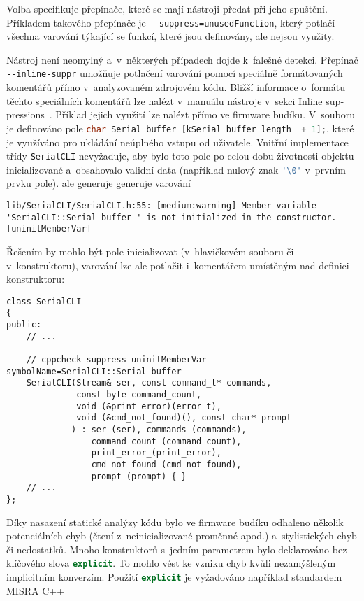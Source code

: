 Volba  specifikuje přepínače, které se mají nástroji
 předat při jeho spuštění. Příkladem takového přepínače je
\verb|--suppress=unusedFunction|, který potlačí všechna varování týkající se
funkcí, které jsou definovány, ale nejsou využity.

Nástroj není neomylný a~v~některých případech dojde k~falešné detekci. Přepínač
\verb|--inline-suppr| umožňuje potlačení varování pomocí speciálně
formátovaných komentářů přímo v~analyzovaném zdrojovém kódu. Bližší informace
o~formátu těchto speciálních komentářů lze nalézt v~manuálu nástroje
v~sekci \foreignlanguage{english}{Inline suppressions}~\cite{cppcheckmanual}.
Příklad jejich využití lze nalézt přímo ve firmware budíku.
V~souboru  je definováno pole
\lstinline[language=C]!char Serial_buffer_[kSerial_buffer_length_ + 1];!,
které je využíváno pro ukládání neúplného vstupu od uživatele. Vnitřní
implementace třídy \texttt{SerialCLI} nevyžaduje, aby bylo toto pole po celou
dobu životnosti objektu inicializované a~obsahovalo validní data (například
nulový znak \lstinline[language=C]!'\0'! v~prvním prvku pole).
 ale generuje generuje varování
\begin{lstlisting}[style=terminal,breakatwhitespace=true]
lib/SerialCLI/SerialCLI.h:55: [medium:warning] Member variable 'SerialCLI::Serial_buffer_' is not initialized in the constructor. [uninitMemberVar]
\end{lstlisting}
Řešením by mohlo být pole inicializovat (v~hlavičkovém souboru či
v~konstruktoru), varování lze ale potlačit i~komentářem umístěným nad definici
konstruktoru:
\begin{lstlisting}[language=myC++]
class SerialCLI
{
public:
    // ...

    // cppcheck-suppress uninitMemberVar symbolName=SerialCLI::Serial_buffer_
    SerialCLI(Stream& ser, const command_t* commands,
              const byte command_count,
              void (&print_error)(error_t),
              void (&cmd_not_found)(), const char* prompt
             ) : ser_(ser), commands_(commands),
                 command_count_(command_count),
                 print_error_(print_error),
                 cmd_not_found_(cmd_not_found),
                 prompt_(prompt) { }
    // ...
};
\end{lstlisting}


Díky nasazení statické analýzy kódu bylo ve firmware budíku odhaleno několik
potenciálních chyb (čtení z~neinicializované proměnné apod.) a~stylistických
chyb či nedostatků. Mnoho konstruktorů s~jedním parametrem bylo deklarováno bez
klíčového slova \lstinline[language=C++]!explicit!. To mohlo vést ke vzniku
chyb kvůli nezamýšleným implicitním konverzím. Použití
\lstinline[language=C++]!explicit! je vyžadováno například standardem
MISRA C++~\cite[pravidlo 12-1-3]{MISRAC++2008}

